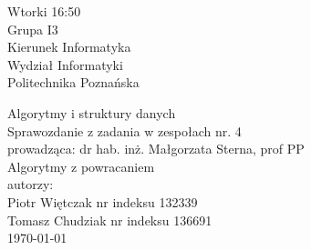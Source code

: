 \documentclass[polish,polish,a4paper]{article}
\begin{document}
	
		\begin{titlepage}
			\begin{flushright}
				{ Wtorki 16:50\\
					Grupa I3\\
					Kierunek Informatyka\\
					Wydział Informatyki\\
					Politechnika Poznańska}
			\end{flushright}
		\vspace*{\fill}
		\begin{center}
			{\Large Algorytmy i struktury danych \\[0.1cm]
				Sprawozdanie z zadania w zespołach nr. 4\\[0.1cm]
				prowadząca: dr hab. inż. Małgorzata Sterna, prof PP}\\
			{\Huge Algorytmy z powracaniem\\ [0.4cm]}
			{\large autorzy:\\[0.1cm]}
			{\large Piotr Więtczak nr indeksu 132339\\[0.1cm] Tomasz Chudziak nr indeksu 136691}\\[0.5cm]
			\today
		\end{center}
		\vspace*{\fill}
	\end{titlepage}
\end{document}
